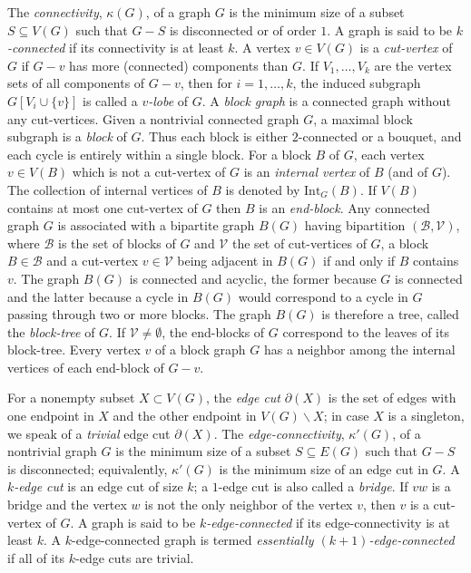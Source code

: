 \documentclass[a4paper,12pt]{article}
\numberwithin{equation}{section}
\begin{document}
The \textit{connectivity}, $\kappa(G)$,  of a graph $G$ is the minimum size of a subset $S\subseteq V(G)$  such that $G-S$ is disconnected or of order $1$. A graph is said to be \textit{$k$-connected} if its connectivity is at least $k$.
A vertex $v\in V(G)$ is a \textit{cut-vertex} of $G$ if $G-v$ has more (connected) components than $G$. If $V_1,\ldots,V_k$ are the vertex sets of all components of $G-v$, then for $i=1,\ldots,k$, the induced subgraph $G[V_i\cup \{v\}]$ is called a \textit{$v$-lobe} of $G$.
 A \textit{block graph} is a connected graph without any cut-vertices. Given a nontrivial connected graph $G$, a maximal block subgraph is a \textit{block} of $G$. Thus each block is either $2$-connected or a bouquet, and each cycle is entirely within a single block. For a block $B$ of $G$, each vertex $v\in V(B)$ which is not a cut-vertex of $G$ is an \textit{internal vertex} of $B$ (and of $G$). The collection of internal vertices of $B$ is denoted by $\mathrm{Int}_G(B)$.
 If $V(B)$ contains at most one cut-vertex of $G$ then $B$ is an \textit{end-block}.
 Any connected graph $G$ is associated with a bipartite graph $B(G)$ having bipartition
$(\mathcal{B},\mathcal{V})$, where $\mathcal{B}$ is the set of blocks of $G$ and $\mathcal{V}$ the set of cut-vertices of $G$, a
block $B\in \mathcal{B}$ and a cut-vertex $v\in \mathcal{V}$ being adjacent in $B(G)$ if and only if $B$ contains
$v$. The graph $B(G)$ is connected and acyclic, the former because $G$ is connected and the latter because a cycle in $B(G)$ would correspond to
a cycle in $G$ passing through two or more blocks.
The graph $B(G)$ is therefore a tree, called the \textit{block-tree} of $G$.
If $\mathcal{V}\neq\emptyset$, the end-blocks of $G$ correspond to the leaves of its block-tree. Every vertex $v$ of a block graph $G$ has a neighbor among the internal vertices of each end-block of $G-v$.

For a nonempty subset $X\subset V(G)$, the \textit{edge cut} $\partial(X)$ is the set of edges with one endpoint in $X$ and the other endpoint in $V(G)\backslash X$; in case $X$ is a singleton, we speak of a \textit{trivial} edge cut $\partial(X)$. The \textit{edge-connectivity}, $\kappa'(G)$, of a nontrivial graph $G$ is the minimum size of a subset $S\subseteq E(G)$ such that $G-S$ is disconnected; equivalently, $\kappa'(G)$ is the minimum size of an edge cut in $G$.  A \textit{$k$-edge cut} is an edge cut of size $k$; a $1$-edge cut is also called a \textit{bridge}. If $vw$ is a bridge and the vertex $w$ is not the only neighbor of the vertex $v$, then $v$ is a cut-vertex of $G$. A graph is said to be \textit{$k$-edge-connected} if its edge-connectivity is at least $k$.
A $k$-edge-connected
graph is termed \textit{essentially $(k+1)$-edge-connected} if all of its $k$-edge cuts
are trivial.
\end{document}
